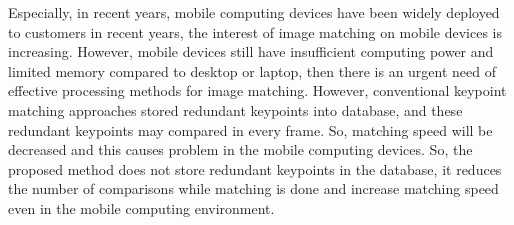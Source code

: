 
Especially, in recent years, mobile computing devices have been widely deployed to customers in recent years, the interest of image matching on mobile devices is increasing. However, mobile devices still have insufficient computing power and limited memory compared to desktop or laptop, then there is an urgent need of effective processing methods for image matching. However, conventional keypoint matching approaches stored redundant keypoints into database, and these redundant keypoints may compared in every frame. So, matching speed will be decreased and this causes problem in the mobile computing devices. So, the proposed method does not store redundant keypoints in the database, it reduces the number of comparisons while matching is done and increase matching speed even in the mobile computing environment.
 


